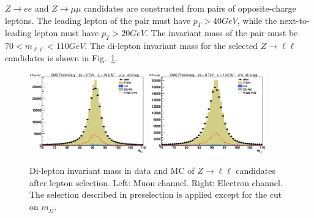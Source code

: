 $Z \rightarrow ee $ and $Z \rightarrow \mu\mu$ candidates are constructed from pairs of opposite-charge leptons. The leading lepton of the pair must have $p_T > 40 GeV$,
while the next-to-leading lepton must have $p_T > 20 GeV$. The invariant mass of the pair must be $ 70 < m_{\ell \ell} < 110 GeV $. The di-lepton invariant mass for the selected $Z \rightarrow \ell \ell$ candidates is shown in Fig.~\ref{fig:m_dilepton}.  
\begin{figure}[htb!]
\begin{center}
\centerline{
\includegraphics[width=0.45\textwidth]{presentation/defense/images/preselection/mu/mLL.eps}
\includegraphics[width=0.45\textwidth]{presentation/defense/images/preselection/el/mLL.eps}
}
\caption{
Di-lepton invariant mass in data and MC of $Z \rightarrow \ell \ell$ candidates after lepton selection. Left: Muon channel. Right: Electron channel. The selection described in preselection is applied except for the cut on $m_{jj}$.
}
\label{fig:m_dilepton}
\end{center}
\end{figure}

